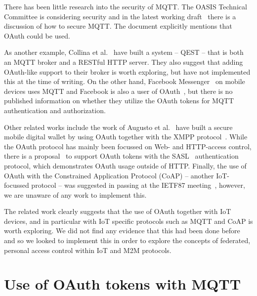 \documentclass{llncs}
\newif\iflong
\begin{document}
There has been little research into the security of MQTT. The OASIS Technical Committee is considering security and 
in the latest working draft~\cite{oasis-mqtt-311-wd15} there is a discussion of how to secure MQTT. 
The document explicitly mentions that OAuth could be used.
\iflong
\begin{quote}
[Implementations] may provide their own authentication mechanism, use an
external authentication system such as LDAP or Oauth tokens, or leverage operating system
authentication mechanisms.
\end{quote}
\fi
As another example, Collina et al.~\cite{collina2012introducing} have built a system -- QEST -- that is both an MQTT broker and 
 a RESTful HTTP server. They also 
suggest that adding OAuth-like support to their broker is worth exploring, but have not implemented this at the time of writing.
On the other hand, Facebook Messenger~\cite{facebook-mqtt} on mobile devices uses MQTT and Facebook is also a user of OAuth~\cite{facebook-login}, but there is 
no published information on whether they utilize the OAuth tokens for MQTT authentication and
authorization.

Other related works include the work of Augusto et al.~\cite{augusto2011xmpp} have built a secure mobile digital wallet by using OAuth together
with the XMPP protocol~\cite{saint2011extensible}. While the OAuth protocol has mainly been focussed on Web- and HTTP-access control, there is a 
proposal~\cite{mills2011sasl} to support OAuth tokens with the SASL~\cite{myers1997simple} authentication
protocol, which demonstrates OAuth usage outside of HTTP. Finally, the use of OAuth with the Constrained Application Protocol (CoAP) -- another IoT-focussed protocol -- was suggested in passing at the 
IETF87 meeting~\cite{ietf87-minutes}, however, we are unaware of any work to implement this.

The related work clearly suggests that the use of OAuth together with IoT devices, and in particular
with IoT specific protocols such as MQTT and CoAP is worth exploring. We did not find any evidence 
that this had been done before and so we looked to implement this in order to explore the concepts
of federated, personal access control within IoT and M2M protocols.

\iflong
\section{Use of OAuth tokens with MQTT}
\end{document}
